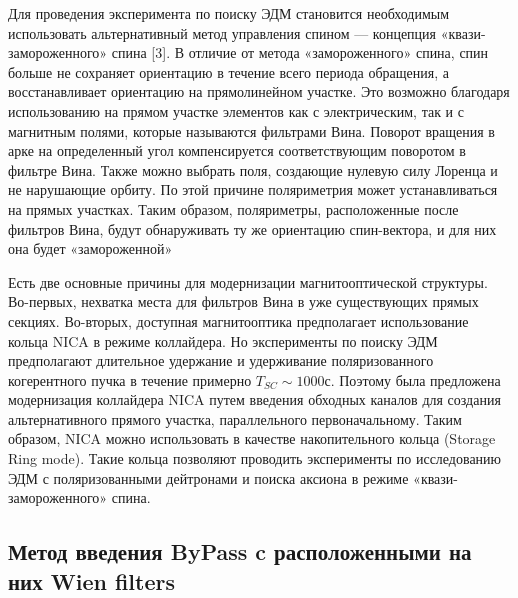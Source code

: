 \par Для проведения эксперимента по поиску ЭДМ становится необходимым использовать альтернативный метод управления спином — концепция «квази-замороженного» спина [3]. В отличие от метода «замороженного» спина, спин больше не сохраняет ориентацию в течение всего периода обращения, а восстанавливает ориентацию на прямолинейном участке. Это возможно благодаря использованию на прямом участке элементов как с электрическим, так и с магнитным полями, которые называются фильтрами Вина. Поворот вращения в арке на определенный угол компенсируется соответствующим поворотом в фильтре Вина. Также можно выбрать поля, создающие нулевую силу Лоренца и не нарушающие орбиту. По этой причине поляриметрия может устанавливаться на прямых участках. Таким образом, поляриметры, расположенные после фильтров Вина, будут обнаруживать ту же ориентацию спин-вектора, и для них она будет «замороженной»

\par Есть две основные причины для модернизации магнитооптической структуры. Во-первых, нехватка места для фильтров Вина в уже существующих прямых секциях. Во-вторых, доступная магнитооптика предполагает использование кольца NICA в режиме коллайдера. Но эксперименты по поиску ЭДМ предполагают длительное удержание и удерживание поляризованного когерентного пучка в течение примерно $T_{SC} \sim 1000 с$. Поэтому была предложена модернизация коллайдера NICA путем введения обходных каналов для создания альтернативного прямого участка, параллельного первоначальному. Таким образом, NICA можно использовать в качестве накопительного кольца (Storage Ring mode). Такие кольца позволяют проводить эксперименты по исследованию ЭДМ с поляризованными дейтронами и поиска аксиона в режиме «квази-замороженного» спина.

\subsection{Метод введения ByPass c расположенными на них Wien filters}\label{sec:EDM/QFS/Wien_filter}

